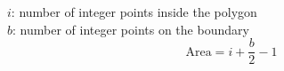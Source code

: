 $i$: number of integer points inside the polygon \\
$b$: number of integer points on the boundary \\
$$\text{Area} = i + \frac{b}{2} - 1$$
